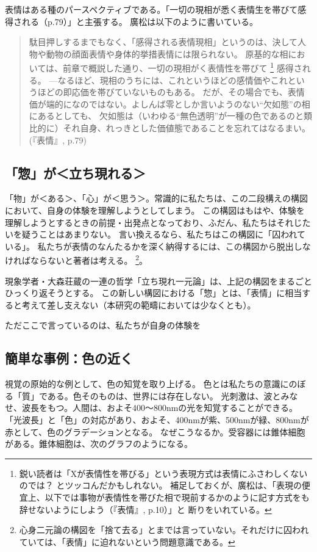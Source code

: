 表情はある種のパースペクティブである。「一切の現相が悉く表情生を帯びて感得される（p.79）」と主張する。
廣松は以下のように書いている。
\begin{quotation}
  駄目押しするまでもなく、「感得される表情現相」というのは、決して人物や動物の顔面表情や身体的挙措表情には限られない。
  原基的な相においては、前章で概説した通り、一切の現相がく表情性を帯びて
  \footnote{鋭い読者は「Xが表情性を帯びる」という表現方式は表情にふさわしくないのでは？
  とツッコんだかもしれない。
  補足しておくが、廣松は、「表現の便宜上、以下では事物が表情性を帯びた相で現前するかのように記す方式をも辞せないようにしよう（『表情』, p.10）」と
  断りをいれている。
  }
  感得される。
  ---なるほど、現相のうちには、これというほどの感情価やこれというほどの即応価を帯びていないものもある。
  だが、その場合でも、表情価が端的になのではない。よしんば零としか言いようのない“欠如態”の相にあるとしても、
  欠如態は（いわゆる“無色透明”が一種の色であるのと類比的に）それ自身、れっきとした価値態であることを忘れてはなるまい。\\
  (『表情』, p.79)
\end{quotation}

\subsection{「惣」が＜立ち現れる＞}
「物」が＜ある＞、「心」が＜思う＞。常識的に私たちは、この二段構えの構図において、自身の体験を理解しようとしてしまう。
この構図はもはや、体験を理解しようとするときの前提・出発点となっており、ふだん、私たちはそれじたいを疑うことはあまりない。
言い換えるなら、私たちはこの構図に「囚われている」。
私たちが表情のなんたるかを深く納得するには、この構図から脱出しなければならないと著者は考える。
\footnote{心身二元論の構図を「捨て去る」とまでは言っていない。それだけに囚われていては、「表情」に迫れないという問題意識である。}。

現象学者・大森荘蔵の一連の哲学「立ち現れ一元論」は、上記の構図をまるごとひっくり返そうとする。
この新しい構図における「惣」とは、「表情」に相当すると考えて差し支えない（本研究の範疇においては少なくとも）。



ただここで言っているのは、私たちが自身の体験を
\subsection{簡単な事例：色の近く}
視覚の原始的な例として、色の知覚を取り上げる。
色とは私たちの意識にのぼる「質」である。色そのものは、世界には存在しない。
光刺激は、波とみなせ、波長をもつ。人間は、およそ400〜800nmの光を知覚することができる。
「光波長」と「色」の対応があり、およそ、400nmが紫、500nmが緑、800nmが赤として、色のグラデーションとなる。
なぜこうなるか。受容器には錐体細胞がある。錐体細胞は、次のグラフのようになる。

